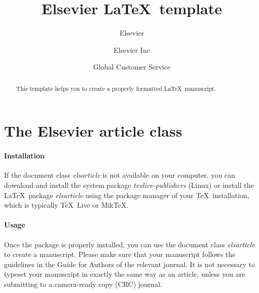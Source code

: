 \documentclass[review,number,sort&compress,3p,twocolumn,11pt]{elsarticle} %
\begin{document}
\begin{frontmatter}

\title{Elsevier \LaTeX\ template}

\author{Elsevier}
\address{Radarweg 29, Amsterdam}

\author[mymainaddress,mysecondaryaddress]{Elsevier Inc}

\author[mysecondaryaddress]{Global Customer Service}

\address[mymainaddress]{1600 John F Kennedy Boulevard, Philadelphia}
\address[mysecondaryaddress]{360 Park Avenue South, New York}

\begin{abstract}
This template helps you to create a properly formatted \LaTeX\ manuscript.
\end{abstract}


\end{frontmatter}

\linenumbers %

\section{The Elsevier article class}

\paragraph{Installation} If the document class \emph{elsarticle} is not available on your computer, you can download and install the system package \emph{texlive-publishers} (Linux) or install the \LaTeX\ package \emph{elsarticle} using the package manager of your \TeX\ installation, which is typically \TeX\ Live or Mik\TeX.

\paragraph{Usage} Once the package is properly installed, you can use the document class \emph{elsarticle} to create a manuscript. Please make sure that your manuscript follows the guidelines in the Guide for Authors of the relevant journal. It is not necessary to typeset your manuscript in exactly the same way as an article, unless you are submitting to a camera-ready copy (CRC) journal.
\end{document}
